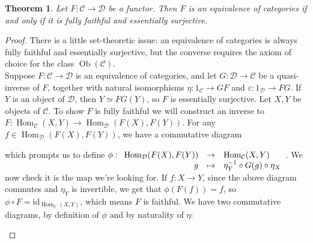 \documentclass{article}
\newcommand{\id}{\mathrm{id}}
\newcommand{\cat}{\mathcal{C}}
\newcommand{\catt}{\mathcal{D}}
\DeclareMathOperator{\Ob}{Ob}
\DeclareMathOperator{\Hom}{Hom}
\renewcommand{\epsilon}{\varepsilon}
\newcommand{\applic}[4]{\begin{array}[t]{rcl}
#1 & \to & #2 \\
#3 & \mapsto & #4
\end{array}}
\newcommand{\warning}{\faExclamationTriangle \hspace{3pt}}
\theoremstyle{plain}
\newtheorem{theorem}{Theorem}[section]
\theoremstyle{definition}
\theoremstyle{remark}
\begin{document}
\begin{theorem}
    Let $F : \cat \to \catt$ be a functor. Then $F$ is an equivalence of categories if and only if it is fully faithful and essentially surjective. 
\end{theorem}

\begin{proof}
    \warning There is a little set-theoretic issue: an equivalence of categories is always fully faithful and essentially surjective, but the converse requires the axiom of choice for the class $\Ob(\cat)$. \\
    Suppose $F : \cat \to \catt$ is an equivalence of categories, and let $G : \catt \to \cat$ be a quasi-inverse of $F$, together with natural isomorphisms $\eta : 1_\cat \to GF$ and $\epsilon : 1_\catt \to FG$. If $Y$ is an object of $\catt$, then $Y \simeq FG(Y)$, so $F$ is essentially surjective. Let $X,Y$ be objects of $\cat$. To show $F$ is fully faithful we will construct an inverse to $F : \Hom_\cat (X,Y) \to \Hom_\catt (F(X),F(Y))$. For any $f \in \Hom_\catt(F(X),F(Y))$, we have a commutative diagram
    \begin{center}
    \end{center}
    which prompts us to define $\phi : \applic{\Hom_\catt (F(X),F(Y))}{\Hom_\cat (X,Y)}{g}{\eta_Y^{-1} \circ G(g) \circ \eta_X}$. We now check it is the map we're looking for. If $f : X \to Y$, since the above diagram commutes and $\eta_Y$ is invertible, we get that $\phi(F(f)) = f$, so $\phi \circ F = \id_{\Hom_\cat (X,Y)}$, which means $F$ is faithful. We have two commutative diagrams, by definition of $\phi$ and by naturality of $\eta$:
    \begin{center}
        \hspace{1.5cm}
\end{center}
\end{proof}
\end{document}
